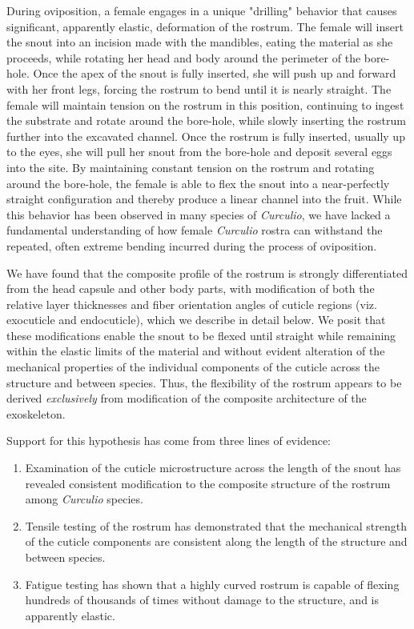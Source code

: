 \documentclass[twocolumn, linenumbers, superscriptaddress]{revtex4-1}
\begin{document}
	During oviposition, a female engages in a unique "drilling" behavior that causes significant, apparently elastic, deformation of the rostrum.
	The female will insert the snout into an incision made with the mandibles, eating the material as she proceeds, while rotating her head and body around the perimeter of the bore-hole.
	Once the apex of the snout is fully inserted, she will push up and forward with her front legs, forcing the rostrum to bend until it is nearly straight.
	The female will maintain tension on the rostrum in this position, continuing to ingest the substrate and rotate around the bore-hole, while slowly inserting the rostrum further into the excavated channel.
	Once the rostrum is fully inserted, usually up to the eyes, she will pull her snout from the bore-hole and deposit several eggs into the site.
	By maintaining constant tension on the rostrum and rotating around the bore-hole, the female is able to flex the snout into a near-perfectly straight configuration and thereby produce a linear channel into the fruit.
	While this behavior has been observed in many species of \textit{Curculio}, we have lacked a fundamental understanding of how female \textit{Curculio} rostra can withstand the repeated, often extreme bending incurred during the process of oviposition.

	We have found that the composite profile of the rostrum is strongly differentiated from the head capsule and other body parts, with modification of both the relative layer thicknesses and fiber orientation angles of cuticle regions (viz. exocuticle and endocuticle), which we describe in detail below.
	We posit that these modifications enable the snout to be flexed until straight while remaining within the elastic limits of the material and without evident alteration of the mechanical properties of the individual components of the cuticle across the structure and between species.
	Thus, the flexibility of the rostrum appears to be derived \emph{exclusively} from modification of the composite architecture of the exoskeleton.
	
	Support for this hypothesis has come from three lines of evidence: 
	\begin{enumerate}
	\item Examination of the cuticle microstructure across the length of the snout has revealed consistent modification to the composite structure of the rostrum among \textit{Curculio} species.
	\item Tensile testing of the rostrum has demonstrated that the mechanical strength of the cuticle components are consistent along the length of the structure and between species.
	\item Fatigue testing has shown that a highly curved rostrum is capable of flexing hundreds of thousands of times without damage to the structure, and is apparently elastic.
	\end{enumerate}
	
\end{document}
